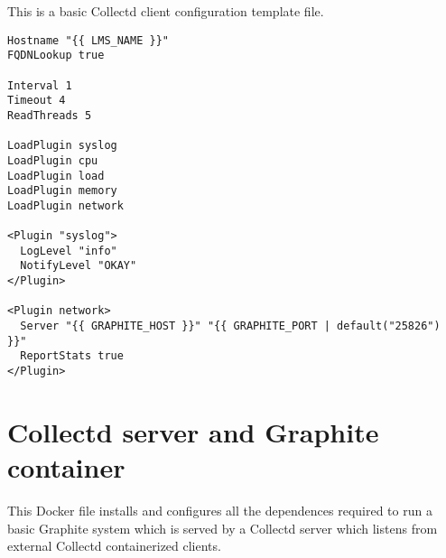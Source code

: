 This is a basic Collectd client configuration template file.

\begin{verbatim}
Hostname "{{ LMS_NAME }}"
FQDNLookup true

Interval 1
Timeout 4
ReadThreads 5

LoadPlugin syslog
LoadPlugin cpu
LoadPlugin load
LoadPlugin memory
LoadPlugin network

<Plugin "syslog">
  LogLevel "info"
  NotifyLevel "OKAY"
</Plugin>

<Plugin network>
  Server "{{ GRAPHITE_HOST }}" "{{ GRAPHITE_PORT | default("25826") }}"
  ReportStats true
</Plugin>
\end{verbatim}

\section{Collectd server and Graphite container}\label{ANX:dockerFiles6}

This Docker file installs and configures all the dependences required to run a basic Graphite system which is served by a Collectd server which listens from external Collectd containerized clients.


